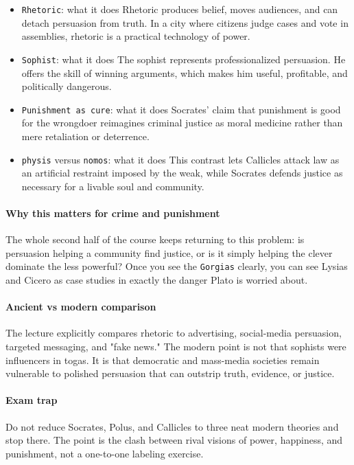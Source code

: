 \documentclass[11pt]{article}
\begin{document}
\begin{itemize}
\item \texttt{Rhetoric}: what it does Rhetoric produces belief, moves audiences, and can detach persuasion from truth. In a city where citizens judge cases and vote in assemblies, rhetoric is a practical technology of power.
\item \texttt{Sophist}: what it does The sophist represents professionalized persuasion. He offers the skill of winning arguments, which makes him useful, profitable, and politically dangerous.
\item \texttt{Punishment as cure}: what it does Socrates' claim that punishment is good for the wrongdoer reimagines criminal justice as moral medicine rather than mere retaliation or deterrence.
\item \texttt{physis} versus \texttt{nomos}: what it does This contrast lets Callicles attack law as an artificial restraint imposed by the weak, while Socrates defends justice as necessary for a livable soul and community.
\end{itemize}

\paragraph{Why this matters for crime and punishment}

The whole second half of the course keeps returning to this problem: is persuasion helping a community find justice, or is it simply helping the clever dominate the less powerful? Once you see the \texttt{Gorgias} clearly, you can see Lysias and Cicero as case studies in exactly the danger Plato is worried about.

\paragraph{Ancient vs modern comparison}

The lecture explicitly compares rhetoric to advertising, social-media persuasion, targeted messaging, and "fake news." The modern point is not that sophists were influencers in togas. It is that democratic and mass-media societies remain vulnerable to polished persuasion that can outstrip truth, evidence, or justice.

\paragraph{Exam trap}

Do not reduce Socrates, Polus, and Callicles to three neat modern theories and stop there. The point is the clash between rival visions of power, happiness, and punishment, not a one-to-one labeling exercise.
\end{document}
